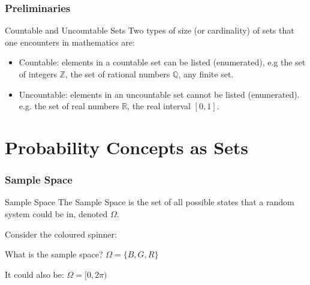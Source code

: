 \documentclass{beamer}
\begin{document}
\begin{frame}
  \frametitle{Preliminaries}
  \begin{block}{Countable and Uncountable Sets}
    Two types of size (or cardinality) of sets that one encounters in mathematics are:
    \begin{itemize}
      \item Countable: elements in a countable set can be listed (enumerated), e.g the set of integers $\mathbb{Z}$, the set of rational numbers $\mathbb{Q}$, any finite set.
      \item Uncountable: elements in an uncountable set cannot be listed (enumerated). e.g. the set of real numbers $\mathbb{R}$, the real interval $[0,1]$.
    \end{itemize}

  \end{block}
\end{frame}


\section{Probability Concepts as Sets}


\begin{frame}
  \frametitle{Sample Space}
  \begin{block}{Sample Space \parencite[p.~192]{measure_tao}}
    The Sample Space is the set of all possible states that a random system could be in, denoted $\Omega$.
  \end{block}
  \begin{example}
    Consider the coloured spinner:
    \begin{center}
    \end{center}
    What is the sample space?
    \pause
    $\Omega = \{B, G, R\}$

    \pause
    It could also be: $\Omega = [0, 2\pi)$
  \end{example}
\end{frame}
\end{document}
